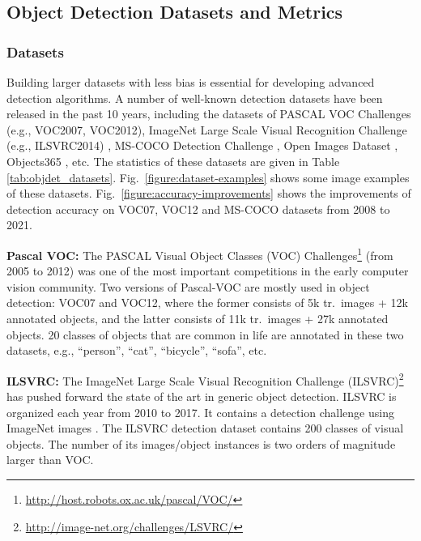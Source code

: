 \documentclass[lettersize,journal]{IEEEtran}
\begin{document}
\subsection{Object Detection Datasets and Metrics}\label{subsec:dataset_metirc}

\subsubsection{Datasets} Building larger datasets with less bias is essential for developing advanced detection algorithms. A number of well-known detection datasets have been released in the past 10 years, including the datasets of PASCAL VOC Challenges \cite{IJCV10-VOC, IJCV15-VOC} (e.g., VOC2007, VOC2012), ImageNet Large Scale Visual Recognition Challenge (e.g., ILSVRC2014) \cite{IJCV15-ILSVRC}, MS-COCO Detection Challenge \cite{ECCV14-COCO}, Open Images Dataset \cite{OpenImages,OpenImagesSegmentation}, Objects365 \cite{shao2019objects365}, etc. The statistics of these datasets are given in Table \ref{tab:objdet_datasets}. Fig.\ \ref{figure:dataset-examples} shows some image examples of these datasets. Fig.\ \ref{figure:accuracy-improvements} shows the improvements of detection accuracy on VOC07, VOC12 and MS-COCO datasets from 2008 to 2021.

\textbf{Pascal VOC:}
The PASCAL Visual Object Classes (VOC) Challenges\footnote{\url{http://host.robots.ox.ac.uk/pascal/VOC/}} (from 2005 to 2012) \cite{IJCV10-VOC, IJCV15-VOC} was one of the most important competitions in the early computer vision community. Two versions of Pascal-VOC are mostly used in object detection: VOC07 and VOC12, where the former consists of 5k tr.\ images + 12k annotated objects, and the latter consists of 11k tr.\ images + 27k annotated objects. 20 classes of objects that are common in life are annotated in these two datasets, e.g., ``person'', ``cat'', ``bicycle'', ``sofa'', etc. 


\textbf{ILSVRC:}
The ImageNet Large Scale Visual Recognition Challenge (ILSVRC)\footnote{\url{http://image-net.org/challenges/LSVRC/}} \cite{IJCV15-ILSVRC} has pushed forward the state of the art in generic object detection. ILSVRC is organized each year from 2010 to 2017. It contains a detection challenge using ImageNet images \cite{CVPR09-ImageNet}. The ILSVRC detection dataset contains 200 classes of visual objects. The number of its images/object instances is two orders of magnitude larger than VOC.
\end{document}
